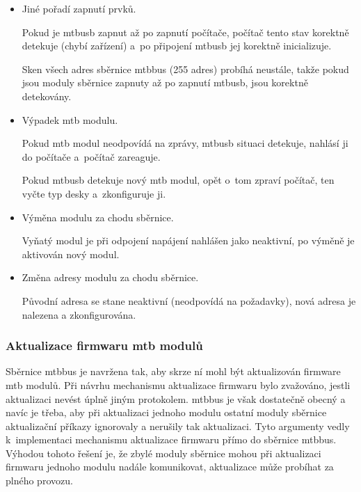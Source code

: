 \begin{itemize}
\item Jiné pořadí zapnutí prvků.

Pokud je \gls{mtbusb} zapnut až po zapnutí počítače, počítač tento stav
korektně detekuje (chybí zařízení) a~po připojení \gls{mtbusb} jej korektně
inicializuje.

Sken všech adres sběrnice \gls{mtbbus} (255 adres) probíhá neustále, takže
pokud jsou moduly sběrnice zapnuty až po zapnutí \gls{mtbusb}, jsou korektně
detekovány.

\item Výpadek \gls{mtb} modulu.

Pokud \gls{mtb} modul neodpovídá na zprávy, \gls{mtbusb} situaci detekuje,
nahlásí ji do počítače a~počítač zareaguje.

Pokud \gls{mtbusb} detekuje nový \gls{mtb} modul, opět o~tom zpraví
počítač, ten vyčte typ desky a~zkonfiguruje ji.

\item Výměna modulu za chodu sběrnice.

Vyňatý modul je při odpojení napájení nahlášen jako neaktivní, po výměně je
aktivován nový modul.

\item Změna adresy modulu za chodu sběrnice.

Původní adresa se stane neaktivní (neodpovídá na požadavky), nová adresa
je nalezena a zkonfigurována.

\end{itemize}


\subsubsection{Aktualizace firmwaru \gls{mtb} modulů} \label{subsub:fw_uprage}

Sběrnice \gls{mtbbus} je navržena tak, aby skrze ní mohl být aktualizován
firmware \gls{mtb} modulů. Při návrhu mechanismu aktualizace firmwaru bylo
zvažováno, jestli aktualizaci nevést úplně jiným protokolem.
\gls{mtbbus} je však dostatečně obecný a navíc je třeba, aby
při aktualizaci jednoho modulu ostatní moduly sběrnice aktualizační příkazy
ignorovaly a nerušily tak aktualizaci. Tyto argumenty vedly k~implementaci
mechanismu aktualizace firmwaru přímo do sběrnice \gls{mtbbus}. Výhodou tohoto
řešení je, že zbylé moduly sběrnice mohou při aktualizaci firmwaru jednoho
modulu nadále komunikovat, aktualizace může probíhat za plného provozu.

